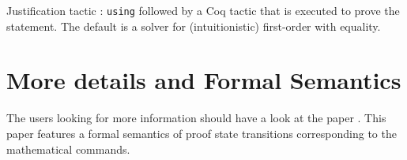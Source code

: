 Justification tactic : {\texttt{using}} followed by a Coq tactic that
is executed to prove the statement. The default is a solver for
(intuitionistic) first-{}order with equality.

\section{More details and Formal Semantics}

The users looking for more information should have a look at the
paper \cite{corbineau08types}. This paper features a formal
semantics of proof state transitions corresponding to the mathematical
commands.
